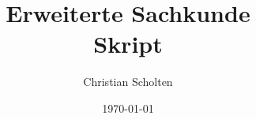 \begin{titlepage}

\title{%
    Erweiterte Sachkunde\\
    Skript}
\author{Christian Scholten}
\date{\today}
\end{titlepage}

\maketitle